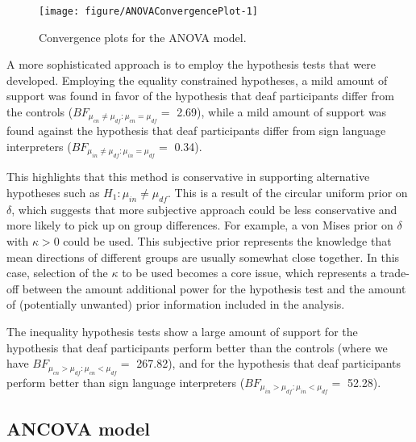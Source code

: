 \begin{figure}
\begin{knitrout}
\color{fgcolor}
\texttt{[image: figure/ANOVAConvergencePlot-1]} 

\end{knitrout}
\caption{Convergence plots for the ANOVA model.}
\label{ANOVAConvergencePlot}
\end{figure}


A more sophisticated approach is to employ the hypothesis tests that were developed. Employing the equality constrained hypotheses, a mild amount of support was found in favor of the hypothesis that deaf participants differ from the controls (\( BF_{\mu_{cn} \neq \mu_{df}:\mu_{cn} = \mu_{df}} = \) 2.69), while  a mild amount of support was found against  the hypothesis that deaf participants differ from sign language interpreters  (\( BF_{\mu_{in} \neq \mu_{df}:\mu_{in} = \mu_{df}} = \) 0.34).

This highlights that this method is conservative in supporting alternative hypotheses such as \( H_1 : \mu_{in} \neq \mu_{df}.\) This is a result of the circular uniform prior on \( \delta \), which suggests that more subjective approach could be less conservative and more likely to pick up on group differences. For example, a von Mises prior on \( \delta \) with \( \kappa > 0\) could be used. This subjective prior represents the knowledge that mean directions of different groups are usually somewhat close together. In this case, selection of the \( \kappa \) to be used becomes a core issue, which represents a trade-off between the amount additional power for the hypothesis test and the amount of (potentially unwanted) prior information included in the analysis.

The inequality hypothesis tests show a large amount of support for the hypothesis that deaf participants perform better than the controls (where we have \( BF_{\mu_{cn} > \mu_{df}:\mu_{cn} < \mu_{df}} = \) 267.82), and for the hypothesis that deaf participants perform better than sign language interpreters (\( BF_{\mu_{in} > \mu_{df}:\mu_{in} < \mu_{df}} = \) 52.28).





\subsection{ANCOVA model}




